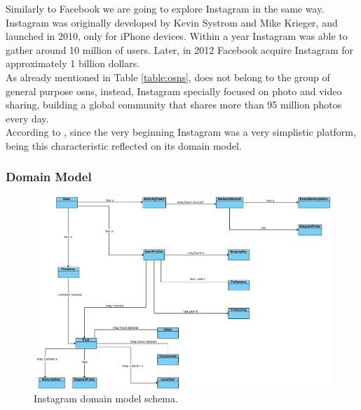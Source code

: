 Similarly to Facebook we are going to explore Instagram in the same way. Instagram was originally developed by Kevin Systrom and Mike Krieger, and launched in 2010, only
for iPhone devices. Within a year Instagram was able to gather around 10 million of users. Later, in 2012 Facebook acquire Instagram for approximately 1 billion dollars.\\
\indent As already mentioned in Table \ref{table:osns}, does not belong to the group of general purpose \glspl{osn}, instead, Instagram specially focused on photo
and video sharing, building a global community that shares more than 95 million photos every day.\\
\indent According to \cite{instabout}, since
the very beginning Instagram was a very simplistic platform, being this characteristic reflected on its domain model.

\subsubsection*{Domain Model}

\begin{figure}[h!]
  \hspace*{-1in}
  \includegraphics[width=1.28\textwidth]{img/instagram-domain-model.jpg}
\caption{\label{img:instadomain} Instagram domain model schema.}
\end{figure}

